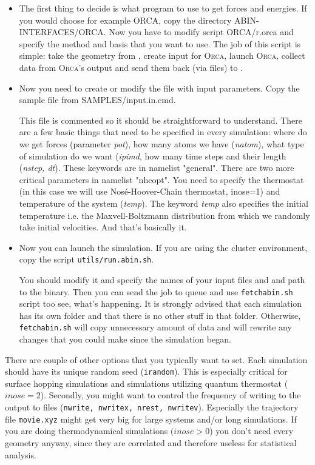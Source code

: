 \begin{itemize}

\item The first thing to decide is what program to use to get forces and energies. If you would choose for example ORCA, copy the directory
ABIN-INTERFACES/ORCA. Now you have to modify script ORCA/r.orca and specify the method and basis that you want to use. The job of this script is simple: take the geometry from \abin, create input for \textsc{Orca}, launch \textsc{Orca}, collect data from \textsc{Orca}'s output and send them back (via files) to \abin.

\item Now you need to create or modify the file with input parameters. Copy the sample file from SAMPLES/input.in.cmd.

This file is commented so it should be straightforward to understand. There are a few basic things that need to be specified in every simulation: where do we get forces (parameter \textit{pot}), how many atoms we have (\textit{natom}), what type of simulation do we want (\textit{ipimd}, how many time steps and their length (\textit{nstep, dt}). These keywords are in namelist "general". There are two more critical parameters in namelist "nhcopt". You need to specify the thermostat (in this case we will use Nosé-Hoover-Chain thermostat, inose=1)
and temperature of the system (\textit{temp}). The keyword \textit{temp} also specifies the initial temperature i.e. the Maxvell-Boltzmann distribution from which we randomly take initial velocities. And that's basically it.

\item Now you can launch the simulation. If you are using the cluster environment, copy the script \texttt{utils/run.abin.sh}.

You should modify it and specify the names of your input files and and path to the \abin binary. Then you can send the job to queue and use \texttt{fetchabin.sh} script too see, what's happening. It is strongly advised that each simulation has its own folder and that there is no other stuff in that folder. Otherwise, \texttt{fetchabin.sh} will copy unnecessary amount of data and will rewrite any changes that you could make since the simulation began. 

\end{itemize}

There are couple of other options that you typically want to set. Each simulation should have its unique random seed (\texttt{irandom}). This is especially critical for surface hopping simulations and simulations utilizing quantum thermostat ($inose=2$). Secondly, you might want to control the frequency of writing to the output to files (\texttt{nwrite, nwritex, nrest, nwritev}). Especially the trajectory file \texttt{movie.xyz} might get very big for large systems and/or long simulations. If you are doing thermodynamical simulations $(inose > 0$) you don't need every geometry anyway, since they are correlated and therefore useless for statistical analysis.

